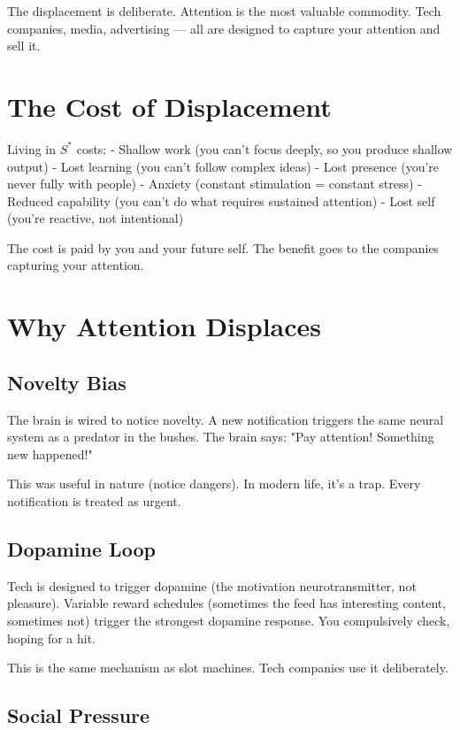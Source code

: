 \documentclass[12pt]{article}
\begin{document}
The displacement is deliberate. Attention is the most valuable commodity. Tech companies, media, advertising — all are designed to capture your attention and sell it.

\section{The Cost of Displacement}

Living in $S^*$ costs:
- Shallow work (you can't focus deeply, so you produce shallow output)
- Lost learning (you can't follow complex ideas)
- Lost presence (you're never fully with people)
- Anxiety (constant stimulation = constant stress)
- Reduced capability (you can't do what requires sustained attention)
- Lost self (you're reactive, not intentional)

The cost is paid by you and your future self. The benefit goes to the companies capturing your attention.

\section{Why Attention Displaces}

\subsection{Novelty Bias}

The brain is wired to notice novelty. A new notification triggers the same neural system as a predator in the bushes. The brain says: "Pay attention! Something new happened!"

This was useful in nature (notice dangers). In modern life, it's a trap. Every notification is treated as urgent.

\subsection{Dopamine Loop}

Tech is designed to trigger dopamine (the motivation neurotransmitter, not pleasure). Variable reward schedules (sometimes the feed has interesting content, sometimes not) trigger the strongest dopamine response. You compulsively check, hoping for a hit.

This is the same mechanism as slot machines. Tech companies use it deliberately.

\subsection{Social Pressure}
\end{document}
